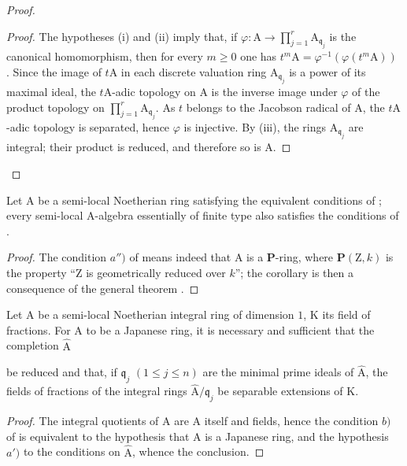 \begin{proof}
\begin{proof}
The hypotheses (i) and (ii) imply that, if $\varphi:\mathrm{A}\to\prod_{j=1}^r\mathrm{A}_{\mathfrak{q}_j}$ is the canonical homomorphism, then for every $m\geqslant 0$ one has $t^m\mathrm{A}=\varphi^{-1}(\varphi(t^m\mathrm{A}))$ . Since the image of $t\mathrm{A}$ in each discrete valuation ring $\mathrm{A}_{\mathfrak{q}_j}$ is a power of its maximal ideal, the $t\mathrm{A}$-adic topology on $\mathrm{A}$ is the inverse image under $\varphi$ of the product topology on $\prod_{j=1}^r\mathrm{A}_{\mathfrak{q}_j}$. As $t$ belongs to the Jacobson radical of $\mathrm{A}$, the $t\mathrm{A}$-adic topology is separated, hence $\varphi$ is injective. By (iii), the rings $\mathrm{A}_{\mathfrak{q}_j}$ are integral; their product is reduced, and therefore so is $\mathrm{A}$.
\end{proof}
\end{proof}

\begin{corollary}[7.6.5]
\label{IV.7.6.5}
Let $\mathrm{A}$ be a semi-local Noetherian ring satisfying the equivalent conditions of ; every semi-local $\mathrm{A}$-algebra essentially of finite type also satisfies the conditions of .
\end{corollary}

\begin{proof}
The condition $a'')$ of  means indeed that $\mathrm{A}$ is a $\boldsymbol{P}$-ring, where $\boldsymbol{P}(\mathrm{Z},k)$ is the property ``$\mathrm{Z}$ is geometrically reduced over $k$''; the corollary is then a consequence of the general theorem .
\end{proof}

\begin{corollary}[7.6.6]
\label{IV.7.6.6}
Let $\mathrm{A}$ be a semi-local Noetherian integral ring of dimension $1$, $\mathrm{K}$ its field of fractions. For $\mathrm{A}$ to be a Japanese ring, it is necessary and sufficient that the completion $\widehat{\mathrm{A}}$


be reduced and that, if $\mathfrak{q}_j$ $(1\leqslant j\leqslant n)$ are the minimal prime ideals of $\widehat{\mathrm{A}}$, the fields of fractions of the integral rings $\widehat{\mathrm{A}}/\mathfrak{q}_j$ be separable extensions of $\mathrm{K}$.
\end{corollary}

\begin{proof}
The integral quotients of $\mathrm{A}$ are $\mathrm{A}$ itself and fields, hence the condition $b)$ of  is equivalent to the hypothesis that $\mathrm{A}$ is a Japanese ring, and the hypothesis $a')$ to the conditions on $\widehat{\mathrm{A}}$, whence the conclusion.
\end{proof}

